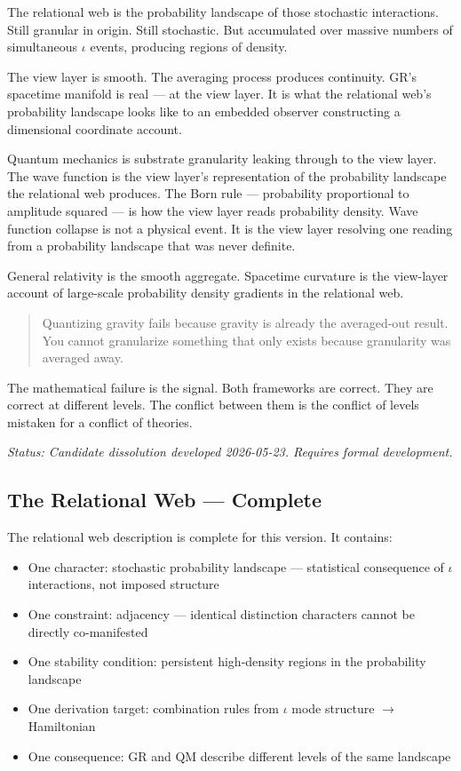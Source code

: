 \documentclass[11pt,letterpaper]{article}
\begin{document}
The relational web is the probability landscape of those stochastic interactions. Still granular in origin. Still stochastic. But accumulated over massive numbers of simultaneous \(\iota\) events, producing regions of density.

The view layer is smooth. The averaging process produces continuity. GR's spacetime manifold is real --- at the view layer. It is what the relational web's probability landscape looks like to an embedded observer constructing a dimensional coordinate account.

Quantum mechanics is substrate granularity leaking through to the view layer. The wave function is the view layer's representation of the probability landscape the relational web produces. The Born rule --- probability proportional to amplitude squared --- is how the view layer reads probability density. Wave function collapse is not a physical event. It is the view layer resolving one reading from a probability landscape that was never definite.

General relativity is the smooth aggregate. Spacetime curvature is the view-layer account of large-scale probability density gradients in the relational web.

\begin{quote}
Quantizing gravity fails because gravity is already the averaged-out result. You cannot granularize something that only exists because granularity was averaged away.
\end{quote}

The mathematical failure is the signal. Both frameworks are correct. They are correct at different levels. The conflict between them is the conflict of levels mistaken for a conflict of theories.

\emph{Status: Candidate dissolution developed 2026-05-23. Requires formal development.}

\subsection{The Relational Web --- Complete}
\label{sec:orgb7838c4}

The relational web description is complete for this version. It contains:

\begin{itemize}
\item One character: stochastic probability landscape --- statistical consequence of \(\iota\) interactions, not imposed structure
\item One constraint: adjacency --- identical distinction characters cannot be directly co-manifested
\item One stability condition: persistent high-density regions in the probability landscape
\item One derivation target: combination rules from \(\iota\) mode structure \(\to\) Hamiltonian
\item One consequence: GR and QM describe different levels of the same landscape
\end{itemize}
\end{document}

